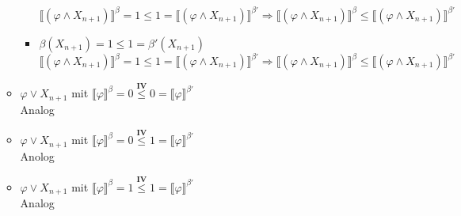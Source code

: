 \documentclass[a4paper,10pt]{article}
\begin{document}
\begin{itemize}
\begin{itemize}
\begin{itemize}
$\llbracket (\varphi \land X_{n+1}) \rrbracket^{\beta} = 1 \leq 1 = \llbracket (\varphi \land X_{n+1})  \rrbracket^{\beta'} \Rightarrow \llbracket (\varphi \land X_{n+1})  \rrbracket^{\beta} \leq \llbracket (\varphi \land X_{n+1})  \rrbracket^{\beta'} $
\item $\beta(X_{n+1}) = 1 \leq 1 = \beta'(X_{n+1})$ \\
$\llbracket (\varphi \land X_{n+1}) \rrbracket^{\beta} = 1 \leq 1 = \llbracket (\varphi \land X_{n+1})  \rrbracket^{\beta'} \Rightarrow \llbracket (\varphi \land X_{n+1})  \rrbracket^{\beta} \leq \llbracket (\varphi \land X_{n+1})  \rrbracket^{\beta'} $
\end{itemize}
\item $\varphi \lor X_{n+1}$ mit $\llbracket \varphi \rrbracket^{\beta} = 0 \stackrel{\textbf{IV}}{\leq} 0 = \llbracket \varphi \rrbracket^{\beta'}$  \\
Analog
\item $\varphi \lor X_{n+1}$ mit $\llbracket \varphi \rrbracket^{\beta} = 0 \stackrel{\textbf{IV}}{\leq} 1 = \llbracket \varphi \rrbracket^{\beta'}$ \\
Anolog
\item $\varphi \lor X_{n+1}$ mit $\llbracket \varphi \rrbracket^{\beta} = 1 \stackrel{\textbf{IV}}{\leq} 1 = \llbracket \varphi \rrbracket^{\beta'}$  \\
Analog
\end{itemize}
\end{itemize}
\end{document}
